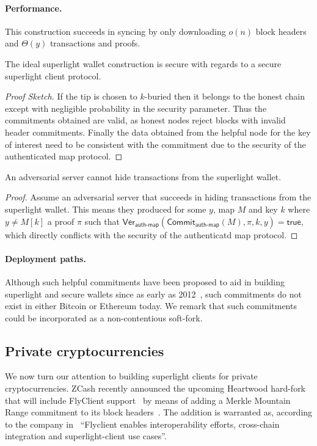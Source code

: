 \paragraph{Performance.} This construction succeeds in syncing by only downloading $o(n)$ block headers and $\Theta(y)$ transactions and proofs.
\begin{theorem}[Security]
The ideal superlight wallet construction is secure with regards to a secure superlight client protocol.
\end{theorem}
\begin{proof}[Proof Sketch]
If the tip is chosen to $k$-buried then it belongs to the honest chain except with negligible probability in the security parameter. Thus the commitments obtained are valid, as honest nodes reject blocks with invalid header commitments. Finally the data obtained from the helpful node for the key of interest need to be consistent with the commitment due to the security of the authenticated map protocol.
\end{proof}

\begin{theorem}[Uncensorability]
\label{superlight-uncensorability}
An adversarial server cannot hide transactions from the superlight wallet.
\end{theorem}
\begin{proof}
Assume an adversarial server that succeeds in hiding transactions from the superlight wallet. This means they produced for some $y$, map $M$ and key $k$ where $y \neq M[k]$ a proof $\pi$ such that $\textsf{Ver}_\textsf{auth-map}(\textsf{Commit}_\textsf{auth-map}(M), \pi, k, y) = \textsf{true}$, which directly conflicts with the security of the authenticatd map protocol.
\end{proof}

\paragraph{Deployment paths.}
Although such helpful commitments have been proposed to aid in building superlight and secure wallets since as early as 2012~\cite{ultimate}, such commitments do not exist in either Bitcoin or Ethereum today. We remark that such commitments could be incorporated as a non-contentious soft-fork.

\subsection{Private cryptocurrencies}
\label{superlight-private}
We now turn our attention to building superlight clients for private cryptocurrencies. ZCash recently announced the upcoming Heartwood hard-fork that will include FlyClient support~\cite{zcash-heartwood-news} by means of adding a Merkle Mountain Range commitment to its block headers~\cite{zcash-flyclient-zip}. The addition is warranted as, according to the company in~\cite{zcash-heartwood-news} ``Flyclient enables interoperability efforts, cross-chain integration and superlight-client use cases''.

